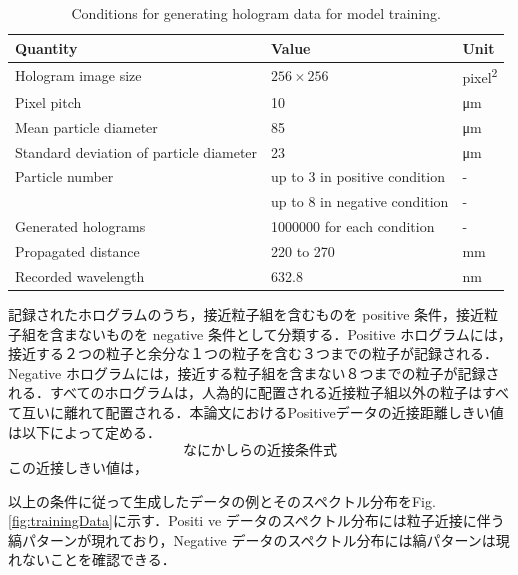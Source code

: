 \begin{table}[H]
    \centering
    \caption{Conditions for generating hologram data for model training.}
    \label{table:trainingData}
    \begin{tabular}{lll}
    Quantity & Value & Unit \\ \hline \hline
    Hologram image size & $\num{256} \times \num{256}$ & \si{pixel\squared} \\ \hline
    Pixel pitch & \num{10} & \si{\um} \\ \hline
    Mean particle diameter & \num{85} & \si{\um} \\ \hline 
    Standard deviation of particle diameter & \num{23} & \si{\um} \\ \hline
    Particle number & up to 3 in positive condition & - \\
    & up to 8 in negative condition & - \\ \hline
    Generated holograms & \num{1000000} for each condition & - \\ \hline
    Propagated distance & \num{220} to \num{270} & \si{\mm} \\ \hline
    Recorded wavelength & \num{632.8} & \si{\nm} \\ \hline
    \end{tabular}
\end{table}

記録されたホログラムのうち，接近粒子組を含むものを positive 条件，接近粒子組を含まないものを negative 条件として分類する．Positive ホログラムには，接近する２つの粒子と余分な１つの粒子を含む３つまでの粒子が記録される．Negative ホログラムには，接近する粒子組を含まない８つまでの粒子が記録される．すべてのホログラムは，人為的に配置される近接粒子組以外の粒子はすべて互いに離れて配置される．本論文におけるPositiveデータの近接距離しきい値は以下によって定める．
\begin{equation}
    なにかしらの近接条件式
\end{equation}
この近接しきい値は，


以上の条件に従って生成したデータの例とそのスペクトル分布をFig. \ref{fig:trainingData}に示す．Positi
ve データのスペクトル分布には粒子近接に伴う縞パターンが現れており，Negative データのスペクトル分布には縞パターンは現れないことを確認できる．

